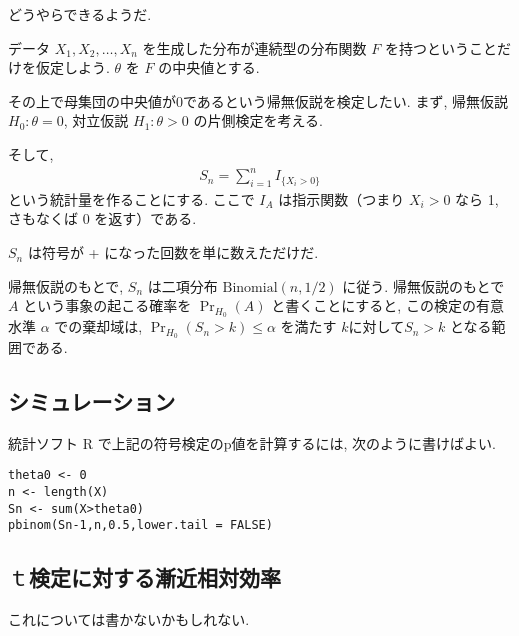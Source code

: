 \documentclass[12pt]{jsarticle}
\begin{document}
どうやらできるようだ.

データ $X_1, X_2, \ldots, X_n$ を生成した分布が連続型の分布関数 $F$ を持つということだけを仮定しよう. $\theta$ を $F$ の中央値とする. 

その上で母集団の中央値が0であるという帰無仮説を検定したい. 
まず, 帰無仮説 $H_0: \theta = 0$, 対立仮説 $H_1: \theta > 0$ の片側検定を考える.

そして, 
\begin{align}
S_n = \sum_{i=1}^{n} I_{\{X_i > 0\}}
\end{align}
という統計量を作ることにする. ここで $I_A$ は指示関数（つまり $X_i > 0$ なら 1, さもなくば 0 を返す）である. 

$S_n$ は符号が + になった回数を単に数えただけだ. 

帰無仮説のもとで, $S_n$ は二項分布 $\mathrm{Binomial}(n, 1/2)$ に従う.
帰無仮説のもとで $A$ という事象の起こる確率を $\Pr_{H_0}(A)$ と書くことにすると, この検定の有意水準 $\alpha$ での棄却域は, $\Pr_{H_0}(S_n>k)\le\alpha$ を満たす $k$に対して$S_n>k$ となる範囲である.


\subsection{シミュレーション}

統計ソフト R で上記の符号検定のp値を計算するには, 次のように書けばよい.
\begin{verbatim}
theta0 <- 0
n <- length(X)
Sn <- sum(X>theta0)
pbinom(Sn-1,n,0.5,lower.tail = FALSE)
\end{verbatim}


\subsection{$ｔ$検定に対する漸近相対効率}
これについては書かないかもしれない.
\end{document}
